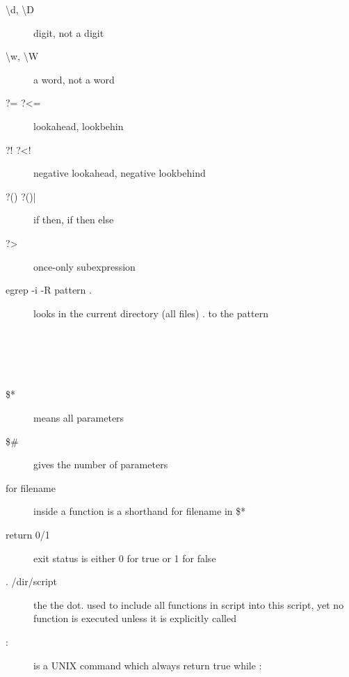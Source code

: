 \documentclass[12pt,a4paper]{report}
\begin{document}
\begin{description}
\item[\textbackslash d, \textbackslash D] digit, not a digit  \\
\item[\textbackslash w, \textbackslash W] a word, not a word  \\
\item[?= ?<=] lookahead, lookbehin  \\
\item[?! ?<!] negative lookahead, negative lookbehind  \\
\item[?() ?()|] if then, if then else  \\
\item[?>] once-only subexpression  \\
\item[egrep -i -R pattern .] looks in the current directory (all files) . to the pattern 
\end{description}


\vspace{40pt}

\section{\color{Magenta}{functions}\\}
\begin{description}
\item[\$*] means all parameters  \\
\item[\$\#] gives the number of parameters  \\
\item[for filename] inside a function is a shorthand for filename in \$*  \\
\item[return 0/1] exit status is either 0 for true or 1 for false  \\
\item[. /dir/script] the the dot. used to include all functions in script into this script, yet no function is executed unless it is explicitly called  \\
\item[:] is a UNIX command which always return true while : 
\end{description}
\end{document}
